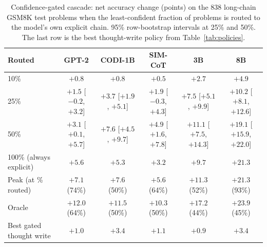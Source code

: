 \begin{table}[htbp]
\caption{Confidence-gated cascade: net accuracy change (points) on the 838 long-chain GSM8K test problems when the least-confident fraction of problems is routed to the model's own explicit chain. 95\% row-bootstrap intervals at 25\% and 50\%. The last row is the best thought-write policy from Table~\ref{tab:policies}.}
\label{tab:cascade}
\centering
\scriptsize
\setlength{\tabcolsep}{1pt}
\begin{tabular}{lccccc}
\toprule
Routed & GPT-2 & CODI-1B & SIM-CoT & 3B & 8B \\
\midrule
10\% & $+0.8$ & $+0.8$ & $+0.5$ & $+2.7$ & $+4.9$ \\
25\% & $+1.5$ [$-0.2$, $+3.2$] & $+3.7$ [$+1.9$, $+5.1$] & $+1.9$ [$-0.3$, $+4.3$] & $+7.5$ [$+5.1$, $+9.9$] & $+10.2$ [$+8.1$, $+12.6$] \\
50\% & $+3.1$ [$+0.1$, $+5.7$] & $+7.6$ [$+4.5$, $+9.7$] & $+4.9$ [$+1.6$, $+7.8$] & $+11.1$ [$+7.5$, $+14.3$] & $+19.1$ [$+15.9$, $+22.0$] \\
100\% (always explicit) & $+5.6$ & $+5.3$ & $+3.2$ & $+9.7$ & $+21.3$ \\
Peak (at \% routed) & $+7.1$ (74\%) & $+7.6$ (50\%) & $+5.6$ (64\%) & $+11.3$ (52\%) & $+21.3$ (93\%) \\
Oracle & $+12.0$ (64\%) & $+11.5$ (50\%) & $+10.3$ (50\%) & $+17.2$ (44\%) & $+23.9$ (45\%) \\
\midrule
Best gated thought write & $+1.0$ & $+3.4$ & $+1.1$ & $+0.9$ & $+3.4$ \\
\bottomrule
\end{tabular}
\end{table}

